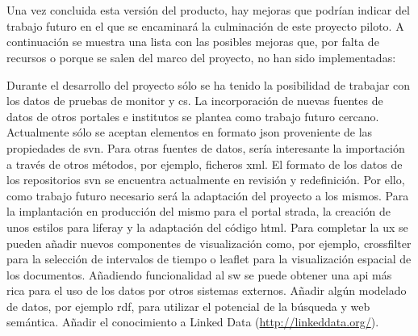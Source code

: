 \section{}



Una vez concluida esta versión del producto, hay mejoras que podrían indicar del trabajo futuro en el que se encaminará la culminación de este proyecto piloto. A continuación se muestra una lista con las posibles mejoras que, por falta de recursos o porque se salen del marco del proyecto, no han sido implementadas:

\begin{itemize}
    Durante el desarrollo del proyecto sólo se ha tenido la posibilidad de trabajar con los datos de pruebas de \gls{monitor} y \gls{cs}. La incorporación de nuevas fuentes de datos de otros portales e institutos se plantea como trabajo futuro cercano.
    Actualmente sólo se aceptan elementos en formato \gls{json} proveniente de las propiedades de \gls{svn}. Para otras fuentes de datos, sería interesante la importación a través de otros métodos, por ejemplo, ficheros \gls{xml}.
El formato de los datos de los repositorios \gls{svn} se encuentra actualmente en revisión y redefinición. Por ello, como trabajo futuro necesario será la adaptación del proyecto a los mismos. 
Para la implantación en producción del mismo para el portal \gls{strada}, la creación de unos estilos  para \gls{liferay} y la adaptación del código \gls{html}.
Para completar la \gls{ux} se pueden añadir nuevos componentes de visualización como, por ejemplo, \gls{crossfilter} para la selección de intervalos de tiempo o \gls{leaflet} para la visualización espacial de los documentos.
    Añadiendo funcionalidad al \gls{sw} se puede obtener una \gls{api} más rica para el uso de los datos por otros sistemas externos.
    Añadir algún modelado de datos, por ejemplo \gls{rdf}, para utilizar el potencial de la búsqueda y web semántica. 
    Añadir el conocimiento a Linked Data (\url{http://linkeddata.org/}).
\end{itemize}


\begin{comment}

-incorporación al portal real
-- utilización de los nuevos datos
-- adaptación del theme de liferay para los portales

Nuevos componentes de visualizacion facil
servicio web apliable para linkedata
Faclidad de nuevos elementos pe XML como entrada en elib
\end{comment}
